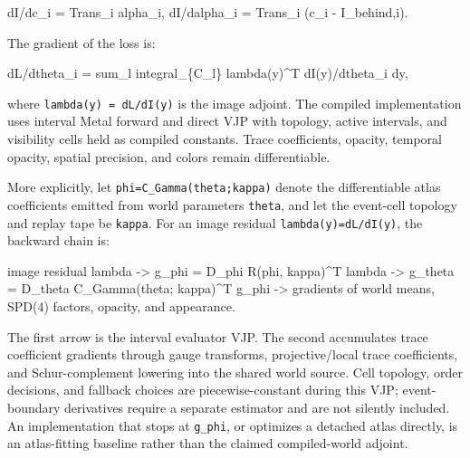 \documentclass[
]{article}
\newenvironment{Shaded}{}{}
\newcommand{\NormalTok}[1]{#1}
\begin{document}
\begin{Shaded}
\begin{Highlighting}[]
\NormalTok{dI/dc\_i     = Trans\_i alpha\_i,}
\NormalTok{dI/dalpha\_i = Trans\_i (c\_i {-} I\_behind,i).}
\end{Highlighting}
\end{Shaded}

The gradient of the loss is:

\begin{Shaded}
\begin{Highlighting}[]
\NormalTok{dL/dtheta\_i =}
\NormalTok{  sum\_l integral\_\{C\_l\} lambda(y)\^{}T dI(y)/dtheta\_i dy,}
\end{Highlighting}
\end{Shaded}

where \texttt{lambda(y)\ =\ dL/dI(y)} is the image adjoint. The compiled
implementation uses interval Metal forward and direct VJP with topology,
active intervals, and visibility cells held as compiled constants. Trace
coefficients, opacity, temporal opacity, spatial precision, and colors
remain differentiable.

More explicitly, let \texttt{phi=C\_Gamma(theta;kappa)} denote the
differentiable atlas coefficients emitted from world parameters
\texttt{theta}, and let the event-cell topology and replay tape be
\texttt{kappa}. For an image residual \texttt{lambda(y)=dL/dI(y)}, the
backward chain is:

\begin{Shaded}
\begin{Highlighting}[]
\NormalTok{image residual lambda}
\NormalTok{  {-}\textgreater{} g\_phi = D\_phi R(phi, kappa)\^{}T lambda}
\NormalTok{  {-}\textgreater{} g\_theta = D\_theta C\_Gamma(theta; kappa)\^{}T g\_phi}
\NormalTok{  {-}\textgreater{} gradients of world means, SPD(4) factors, opacity, and appearance.}
\end{Highlighting}
\end{Shaded}

The first arrow is the interval evaluator VJP. The second accumulates
trace coefficient gradients through gauge transforms, projective/local
trace coefficients, and Schur-complement lowering into the shared world
source. Cell topology, order decisions, and fallback choices are
piecewise-constant during this VJP; event-boundary derivatives require a
separate estimator and are not silently included. An implementation that
stops at \texttt{g\_phi}, or optimizes a detached atlas directly, is an
atlas-fitting baseline rather than the claimed compiled-world adjoint.
\end{document}
